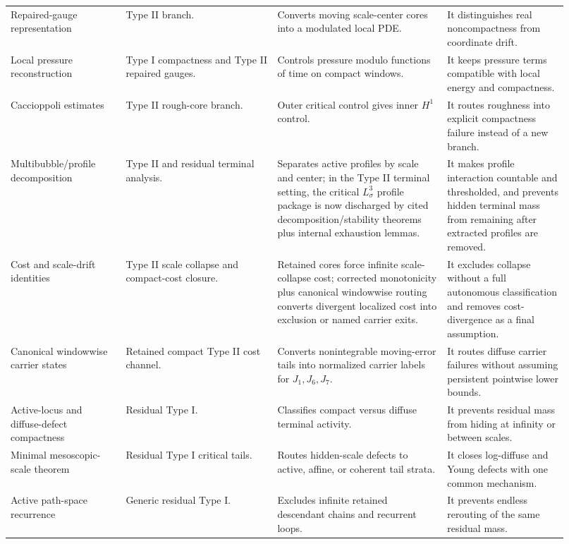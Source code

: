 \documentclass[11pt]{amsart}
\begin{document}
\begin{longtable}{@{}>{\raggedright\arraybackslash}p{0.19\linewidth}>{\raggedright\arraybackslash}p{0.25\linewidth}>{\raggedright\arraybackslash}p{0.28\linewidth}>{\raggedright\arraybackslash}p{0.20\linewidth}@{}}
Repaired-gauge representation & Type II branch. & Converts moving scale-center cores into a modulated local PDE. & It distinguishes real noncompactness from coordinate drift. \\
Local pressure reconstruction & Type I compactness and Type II repaired gauges. & Controls pressure modulo functions of time on compact windows. & It keeps pressure terms compatible with local energy and compactness. \\
Caccioppoli estimates & Type II rough-core branch. & Outer critical control gives inner \(H^1\) control. & It routes roughness into explicit compactness failure instead of a new branch. \\
Multibubble/profile decomposition & Type II and residual terminal analysis. & Separates active profiles by scale and center; in the Type II terminal setting, the critical \(L^3_\sigma\) profile package is now discharged by cited decomposition/stability theorems plus internal exhaustion lemmas. & It makes profile interaction countable and thresholded, and prevents hidden terminal mass from remaining after extracted profiles are removed. \\
Cost and scale-drift identities & Type II scale collapse and compact-cost closure. & Retained cores force infinite scale-collapse cost; corrected monotonicity plus canonical windowwise routing converts divergent localized cost into exclusion or named carrier exits. & It excludes collapse without a full autonomous classification and removes cost-divergence as a final assumption. \\
Canonical windowwise carrier states & Retained compact Type II cost channel. & Converts nonintegrable moving-error tails into normalized carrier labels for \(J_1,J_6,J_7\). & It routes diffuse carrier failures without assuming persistent pointwise lower bounds. \\
Active-locus and diffuse-defect compactness & Residual Type I. & Classifies compact versus diffuse terminal activity. & It prevents residual mass from hiding at infinity or between scales. \\
Minimal mesoscopic-scale theorem & Residual Type I critical tails. & Routes hidden-scale defects to active, affine, or coherent tail strata. & It closes log-diffuse and Young defects with one common mechanism. \\
Active path-space recurrence & Generic residual Type I. & Excludes infinite retained descendant chains and recurrent loops. & It prevents endless rerouting of the same residual mass. \\
\bottomrule
\end{longtable}
\end{document}
